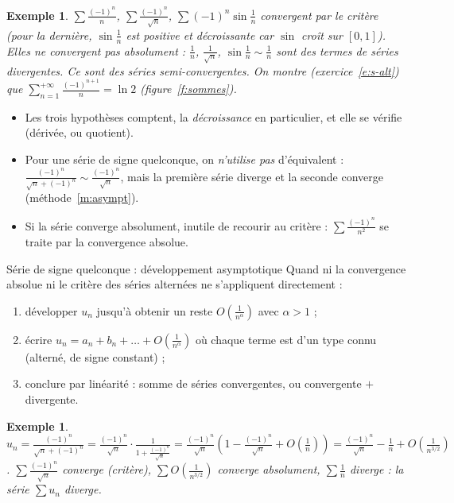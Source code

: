 \documentclass[a4paper,11pt]{article}
\numberwithin{equation}{section}
\numberwithin{figure}{section}
\numberwithin{table}{section}
\theoremstyle{enonce}
\theoremstyle{exemple}
\newtheorem{exemple}[definition]{Exemple}
\theoremstyle{remarque}
\begin{document}
\begin{exemple}
$\sum\frac{(-1)^n}n$, $\sum\frac{(-1)^n}{\sqrt n}$, $\sum(-1)^n\sin\frac1n$ convergent par le critère (pour la dernière,
$\sin\frac1n$ est positive et décroissante car $\sin$ croît sur $[0,1]$). Elles ne convergent pas absolument : $\frac1n$,
$\frac1{\sqrt n}$, $\sin\frac1n\sim\frac1n$ sont des termes de séries divergentes. Ce sont des séries semi-convergentes. On
montre (exercice~\ref{e:s-alt}) que $\sum_{n=1}^{+\infty}\frac{(-1)^{n+1}}n=\ln2$ (figure~\ref{f:sommes}).
\end{exemple}

\begin{attention}
\begin{itemize}[leftmargin=1.1em]
\item Les trois hypothèses comptent, la \emph{décroissance} en particulier, et elle se vérifie (dérivée, ou quotient).
\item Pour une série de signe quelconque, on \emph{n'utilise pas} d'équivalent : $\frac{(-1)^n}{\sqrt n+(-1)^n}\sim\frac{(-1)^n}{\sqrt n}$,
mais la première série diverge et la seconde converge (méthode~\ref{m:asympt}).
\item Si la série converge absolument, inutile de recourir au critère : $\sum\frac{(-1)^n}{n^2}$ se traite par la convergence absolue.
\end{itemize}
\end{attention}

\begin{methode}{Série de signe quelconque : développement asymptotique}\label{m:asympt}
Quand ni la convergence absolue ni le critère des séries alternées ne s'appliquent directement :
\begin{enumerate}
\item développer $u_n$ jusqu'à obtenir un reste $O\left(\frac1{n^\alpha}\right)$ avec $\alpha>1$ ;
\item écrire $u_n=a_n+b_n+\dots+O\left(\frac1{n^\alpha}\right)$ où chaque terme est d'un type connu (alterné, de signe constant) ;
\item conclure par linéarité : somme de séries convergentes, ou convergente $+$ divergente.
\end{enumerate}
\end{methode}

\begin{exemple}
$u_n=\frac{(-1)^n}{\sqrt n+(-1)^n}=\frac{(-1)^n}{\sqrt n}\cdot\frac1{1+\frac{(-1)^n}{\sqrt n}}
=\frac{(-1)^n}{\sqrt n}\left(1-\frac{(-1)^n}{\sqrt n}+O\left(\frac1n\right)\right)=\frac{(-1)^n}{\sqrt n}-\frac1n+O\left(\frac1{n^{3/2}}\right)$.
$\sum\frac{(-1)^n}{\sqrt n}$ converge (critère), $\sum O\left(\frac1{n^{3/2}}\right)$ converge absolument, $\sum\frac1n$ diverge : la série
$\sum u_n$ \emph{diverge}.
\end{exemple}
\end{document}
